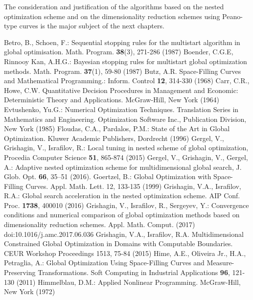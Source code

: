 The consideration and justification of the algorithms based on the nested optimization scheme and on the dimensionality reduction schemes using Peano-type curves is the major subject of the next chapters. 
% 
\begin{thebibliography}{99.}
 Betro, B., Schoen, F.: Sequential stopping rules for the multistart algorithm in global optimisation. Math. Program. \textbf{38}(3), 271-286 (1987)
	Boender, C.G.E, Rinnooy Kan, A.H.G.: Bayesian stopping rules for multistart global optimization methods. Math. Program. \textbf{37}(1), 59-80 (1987)
	Butz, A.R. Space-Filling Curves and Mathematical Programming.: Inform. Control \textbf{12}, 314-330 (1968)
	Carr, C.R., Howe, C.W. Quantitative Decision Procedures in Management and Economic: Deterministic Theory and Applications. McGraw-Hill, New York (1964)
	Evtushenko, Yu.G.: Numerical Optimization Techniques. Translation Series in Mathematics and Engineering. Optimization Software  Inc., Publication Division, New York (1985)
 Floudas, C.A., Pardalos, P.M.: State of the Art in Global Optimization. Kluwer Academic Publishers, Dordrecht (1996)
 Gergel, V.,  Grishagin, V., Israfilov, R.: Local tuning in nested scheme of global optimization, Procedia Computer Science \textbf{51}, 865-874 (2015) 
	Gergel, V., Grishagin, V., Gergel, A.: Adaptive nested optimization scheme for multidimensional global search, J. Glob. Opt. \textbf{66}, 35–51 (2016).
	Goertzel, B.: Global Optimization with Space-Filling Curves. Appl. Math. Lett. 12, 133-135 (1999)
	Grishagin, V.A., Israfilov, R.A.: Global search acceleration in the nested optimization scheme. AIP Conf. Proc. \textbf{1738}, 400010 (2016)
	Grishagin, V.,  Israfilov, R., Sergeyev, Y.: Convergence conditions and numerical comparison of global optimization methods based on dimensionality reduction schemes. Appl. Math.  Comput. (2017) doi:10.1016/j.amc.2017.06.036
Grishagin, V.A., Israfilov, R.A. Multidimensional Constrained Global Optimization in Domains with Computable Boundaries. CEUR Workshop Proceedings 1513, 75-84 (2015)
	Hime, A.E., Oliveira Jr., H.A., Petraglia, A.: Global Optimization Using Space-Filling Curves and Measure-Preserving Transformations. Soft Computing in Industrial Applications \textbf{96}, 121-130 (2011)
	Himmelblau, D.M.: Applied Nonlinear Programming. McGraw-Hill, New York (1972)

\end{thebibliography}
